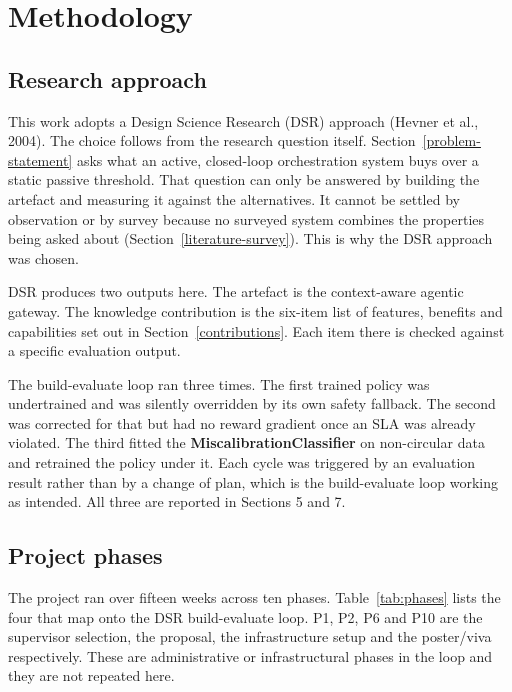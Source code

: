 \hypertarget{methodology}{%
\section{Methodology}\label{methodology}}

\hypertarget{research-approach}{%
\subsection{Research approach}\label{research-approach}}

This work adopts a Design Science Research (DSR) approach (Hevner et
al., 2004). The choice follows from the research question itself. Section~\ref{problem-statement} asks what an active, closed-loop orchestration system buys over a
static passive threshold. That question can only be answered by building 
the artefact and measuring it against the alternatives. It cannot be settled
by observation or by survey because no surveyed system combines the properties
being asked about (Section~\ref{literature-survey}). This is why the DSR approach was chosen.

DSR produces two outputs here. The artefact is the context-aware agentic
gateway. The knowledge contribution is the six-item list of features,
benefits and capabilities set out in Section~\ref{contributions}. Each item there is
checked against a specific evaluation output.

The build-evaluate loop ran three times. The first
trained policy was undertrained and was silently overridden by its own
safety fallback. The second was corrected for that but had no reward
gradient once an SLA was already violated. The third fitted the
\textbf{MiscalibrationClassifier} on non-circular data and retrained the
policy under it. Each cycle was triggered by an evaluation result rather
than by a change of plan, which is the build-evaluate loop working as
intended. All three are reported in Sections 5 and 7.

\hypertarget{project-phases}{%
\subsection{Project phases}\label{project-phases}}

The project ran over fifteen weeks across ten phases. Table~\ref{tab:phases}
lists the four that map onto the DSR build-evaluate loop. P1, P2, P6 and
P10 are the supervisor selection, the proposal, the infrastructure setup and the
poster/viva respectively. These are administrative or infrastructural phases
in the loop and they are not repeated here.

